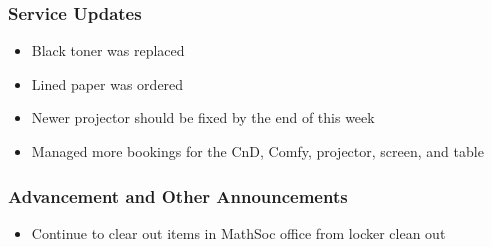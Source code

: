 \subsubsection*{Service Updates}
\begin{itemize}
\item Black toner was replaced
\item Lined paper was ordered
\item Newer projector should be fixed by the end of this week 
\item Managed more bookings for the CnD, Comfy, projector, screen, and table
\end{itemize}

\subsubsection*{Advancement and Other Announcements}
\begin{itemize}
\item Continue to clear out items in MathSoc office from locker clean out
\end{itemize}